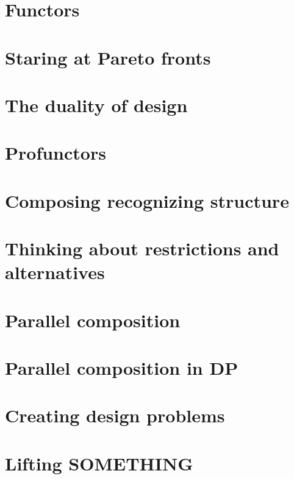 \documentclass[paper=6in:9in,pagesize=pdftex,
 headinclude=off,footinclude=on,11pt,twoside]{scrbook}
\begin{document}
\chapter{Functors}

\clearpage
\chapter{Staring at Pareto fronts}

\clearpage
\chapter{The duality of design}

\clearpage
\clearpage
\chapter{Profunctors}

\clearpage
\chapter{Composing recognizing structure}

\clearpage
\chapter{Thinking about restrictions and alternatives}

\clearpage
\chapter{Parallel composition}

\clearpage
\chapter{Parallel composition in DP}

\clearpage
\chapter{Creating design problems}

\clearpage
\chapter{Lifting SOMETHING}

\clearpage
\end{document}
